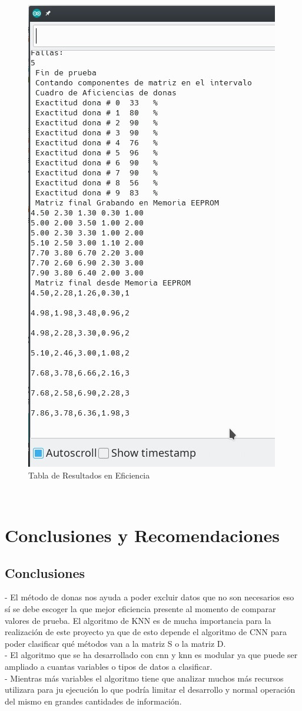 \documentclass[10pt,a4paper]{article}
\begin{document}
\begin{figure}[H]
\caption{Tabla de Resultados en Eficiencia}
\centering
\includegraphics[scale=0.9]{tablaefi.jpg}
\end{figure}
\\
\section{Conclusiones y Recomendaciones}
\subsection{Conclusiones}
- El método de donas nos ayuda a poder excluir datos que no son necesarios eso sí se debe escoger la que 	mejor eficiencia presente al momento de comparar valores de prueba. El algoritmo de KNN es de mucha importancia para la realización de este proyecto ya que de esto depende el algoritmo de CNN para poder clasificar qué métodos van a la matriz S o la matriz D.\\
- El algoritmo que se ha desarrollado con cnn y knn es modular ya que puede ser ampliado a cuantas variables o tipos de datos a clasificar.\\
- Mientras más variables el algoritmo tiene que analizar muchos más recursos utilizara para ju ejecución lo que podría limitar el desarrollo y normal operación del mismo en grandes cantidades de información.\\
\end{document}
